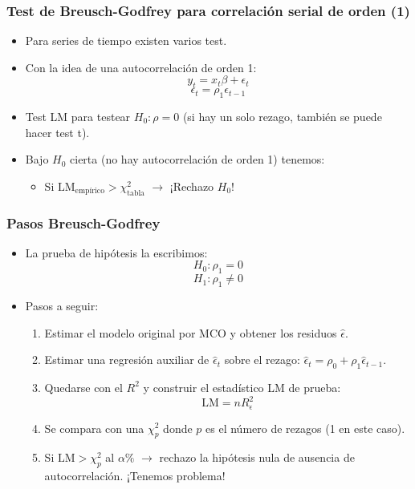 \documentclass{beamer}
\begin{document}
\begin{frame}
\frametitle{Test de Breusch-Godfrey para correlación serial de orden (1)}

\begin{itemize}
  \item Para series de tiempo existen varios test.
  \item Con la idea de una autocorrelación de orden 1:
  \[
  y_t = x_t \beta + \epsilon_t
  \]
  \[
  \epsilon_t = \rho_1 \epsilon_{t-1}
  \]
  \item Test LM para testear \( H_0: \rho = 0 \) (si hay un solo rezago, también se puede hacer test t).
  \item Bajo \( H_0 \) cierta (no hay autocorrelación de orden 1) tenemos:
  \begin{itemize}
    \item Si \( \text{LM}_{\text{empírico}} > \chi^2_{\text{tabla}} \) \(\rightarrow\) ¡Rechazo \( H_0 \)!
  \end{itemize}
\end{itemize}

\end{frame}
\begin{frame}
\frametitle{Pasos Breusch-Godfrey}

\begin{itemize}
  \item La prueba de hipótesis la escribimos:
  \[
  H_0 : \rho_1 = 0
  \]
  \[
  H_1 : \rho_1 \neq 0
  \]
  \item Pasos a seguir:
  \begin{enumerate}
    \item Estimar el modelo original por MCO y obtener los residuos \(\hat{\epsilon}\).
    \item Estimar una regresión auxiliar de \(\hat{\epsilon}_t\) sobre el rezago: \(\hat{\epsilon}_t = \rho_0 + \rho_1 \hat{\epsilon}_{t-1}\).
    \item Quedarse con el \(R^2\) y construir el estadístico LM de prueba:
    \[
    \text{LM} = nR^2_\epsilon
    \]
    \item Se compara con una \(\chi^2_p\) donde \(p\) es el número de rezagos (1 en este caso).
    \item Si \(\text{LM} > \chi^2_p\) al \(\alpha \%\) \(\rightarrow\) rechazo la hipótesis nula de ausencia de autocorrelación. ¡Tenemos problema!
  \end{enumerate}
\end{itemize}

\end{frame}
\end{document}
